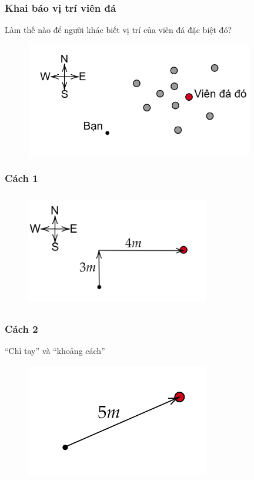 \begin{frame}
\frametitle{Khai báo vị trí viên đá}
Làm thế nào để người khác biết vị trí của viên đá đặc biệt đó?
\begin{figure}[H]
    \centering
    \includegraphics[width=10cm, height=5cm]{Slides/Figure/thestone.png}
\end{figure}
\end{frame}
\begin{frame}
    \frametitle{Cách 1}
    \begin{figure}[H]
        \centering
        \includegraphics[width=8cm, height=5cm]{Slides/Figure/3m4m.png}
    \end{figure}
\end{frame}
\begin{frame}
    \frametitle{Cách 2}
    ``Chỉ tay'' và ``khoảng cách''
    \begin{figure}[H]
        \centering
        \includegraphics[width=8cm, height=5cm]{Slides/Figure/5m.png}
    \end{figure}
\end{frame}